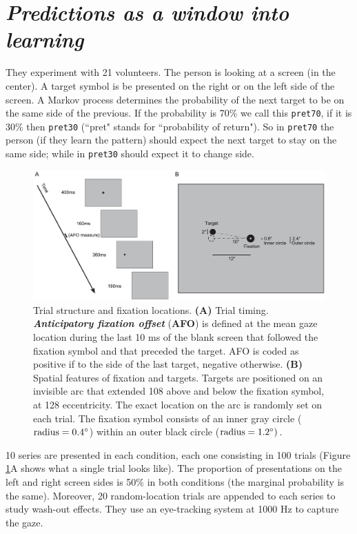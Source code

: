 \section[Predictions as a window into learning]{\textit{Predictions as a window into learning}\\ }
They experiment with 21 volunteers. The person is looking at a screen (in the center). A target symbol is be presented on the right or on the left side of the screen. A Markov process determines the probability of the next target to be on the same side of the previous. If the probability is 70\% we call this \texttt{pret70}, if it is 30\% then \texttt{pret30} (``pret" stands for ``probability of return"). So in \texttt{pret70} the person (if they learn the pattern) should expect the next target to stay on the same side; while in \texttt{pret30} should expect it to change side.

\begin{figure}[!ht]
    \centering
    \captionsetup{width=.8\linewidth}
    \includegraphics[width=0.7\linewidth]{images/notaro.png}
    \caption{Trial structure and fixation locations. \textbf{(A)} Trial timing. \textbf{\textit{Anticipatory fixation offset}} (\textbf{AFO}) is defined at the mean gaze location during the last 10 ms of the blank screen that followed the fixation symbol and that preceded the target. AFO is coded as positive if to the side of the last target, negative otherwise. \textbf{(B)} Spatial features of fixation and targets. Targets are positioned on an invisible arc that extended 108 above and below the fixation symbol, at 128 eccentricity. The exact location on the arc is randomly set on each trial. The fixation symbol consists of an inner gray circle ($\text{radius} = 0.4\degree$) within an outer black circle ($\text{radius} = 1.2\degree)$.}
    \label{fig:notaro}
\end{figure}

10 series are presented in each condition, each one consisting in 100 trials (Figure \ref{fig:notaro}A shows what a single trial looks like).
The proportion of presentations on the left and right screen sides is 50\% in both conditions (the marginal probability is the same).
Moreover, 20 random-location trials are appended to each series to study wash-out effects. They use an eye-tracking system at 1000 Hz to capture the gaze.
